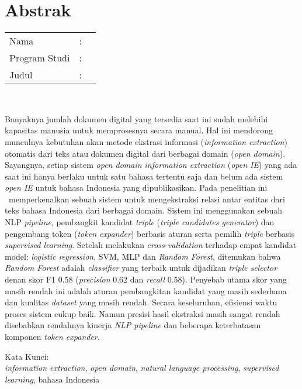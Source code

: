 %
%
%

\chapter*{Abstrak}

\vspace*{0.2cm}

\noindent \begin{tabular}{l l p{10cm}}
	Nama&: & \penulis \\
	Program Studi&: & \program \\
	Judul&: & \judul \\
\end{tabular} \\ 

\vspace*{0.5cm}

\noindent Banyaknya jumlah dokumen digital yang tersedia saat ini sudah melebihi kapasitas manusia untuk memprosesnya secara manual. Hal ini mendorong munculnya kebutuhan akan metode ekstrasi informasi (\textit{information extraction}) otomatis dari teks atau dokumen digital dari berbagai domain (\textit{open domain}). Sayangnya, setiap sistem \textit{open domain information extraction} (\textit{open IE}) yang ada saat ini hanya berlaku untuk satu bahasa tertentu saja dan belum ada sistem \textit{open IE} untuk bahasa Indonesia yang dipublikasikan. Pada penelitian ini \saya~memperkenalkan sebuah sistem untuk mengekstraksi relasi antar entitas dari teks bahasa Indonesia dari berbagai domain. Sistem ini menggunakan sebuah NLP \textit{pipeline}, pembangkit kandidat \textit{triple} (\textit{triple candidates generator}) dan pengembang token (\textit{token expander}) berbasis aturan serta pemilih \textit{triple} berbasis \textit{supervised learning}. Setelah melakukan \textit{cross-validation} terhadap empat kandidat model: \textit{logistic regression}, SVM, MLP dan \textit{Random Forest}, ditemukan bahwa \textit{Random Forest} adalah \textit{classifier} yang terbaik untuk dijadikan \textit{triple selector} denan skor F1 0.58 (\textit{precision} 0.62 dan \textit{recall} 0.58). Penyebab utama skor yang masih rendah ini adalah aturan pembangkitan kandidat yang masih sederhana dan kualitas \textit{dataset} yang masih rendah. Secara keseluruhan, efisiensi waktu proses sistem cukup baik. Namun presisi hasil ekstraksi masih sangat rendah disebabkan rendahnya kinerja \textit{NLP pipeline} dan beberapa keterbatasan komponen \textit{token expander}. \\

\vspace*{0.2cm}

\noindent Kata Kunci: \\ 
\noindent \textit{information extraction}, \textit{open domain}, \textit{natural language processing}, \textit{supervised learning}, bahasa Indonesia \\

\newpage